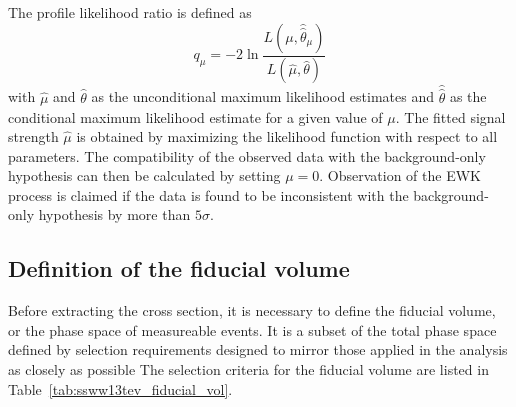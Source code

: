 The profile likelihood ratio is defined as
\begin{equation}
  q_{\mu} = -2\ln\frac{L(\mu,\hat{\hat{\theta}}_{\mu})}{L(\hat{\mu},\hat{\theta})}
  \label{dq:ssww13tev_xsec_test_statistic}
\end{equation}
with $\hat{\mu}$ and $\hat{\theta}$ as the unconditional maximum likelihood estimates and $\hat{\hat{\theta}}$ as the conditional maximum likelihood estimate for a given value of $\mu$.
The fitted signal strength $\hat{\mu}$ is obtained by maximizing the likelihood function with respect to all parameters.
The compatibility of the observed data with the background-only hypothesis can then be calculated by setting $\mu=0$.
Observation of the \ssww EWK process is claimed if the data is found to be inconsistent with the background-only hypothesis by more than $5\sigma$.


\subsection{Definition of the fiducial volume}\label{ssww13tev:xsec_fid_vol}
Before extracting the cross section, it is necessary to define the fiducial volume, or the phase space of measureable events.
It is a subset of the total phase space defined by selection requirements designed to mirror those applied in the analysis as closely as possible
The selection criteria for the fiducial volume are listed in Table~\ref{tab:ssww13tev_fiducial_vol}.

